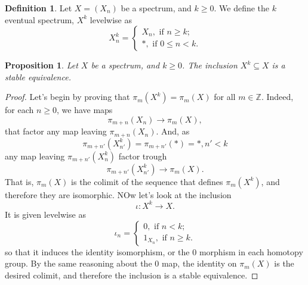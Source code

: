\documentclass[a4paper,english,11pt]{article}
\theoremstyle{definition}
\newtheorem{Def}{Definition}
\theoremstyle{plain}
\newtheorem{prop}{Proposition}[section]
\theoremstyle{remark}
\begin{document}
\begin{Def}
  Let \(X=(X_n)\) be a spectrum, and \(k\geq 0\). We define the \(k\) eventual spectrum, \(X^k\) levelwise as 
  \[X^k_n=\begin{cases}
    X_n,\text{ if }n\geq k;\\
    \ast,\text{ if } 0\leq n < k.
  \end{cases}\]
\end{Def}
\begin{prop}
  Let \(X\) be a spectrum, and \(k\geq 0\). The inclusion \(X^k\subseteq X\) is a stable equivalence.
\end{prop}
\begin{proof}
  Let's begin by proving that \(\pi_m(X^k)=\pi_m(X)\) for all \(m\in\mathbb{Z}\). Indeed, for each \(n\geq 0\), we have maps
  \[\pi_{m+n}(X_n)\to\pi_m(X),\]
  that factor any map leaving \(\pi_{m+n}(X_n)\). And, as 
  \[\pi_{m+n'}(X^k_{n'})=\pi_{m+n'}(\ast)=\ast, n'<k\]
  any map leaving \(\pi_{m+n'}(X^k_n)\) factor trough 
  \[\pi_{m+n'}(X^k_{n'})\to\pi_m(X).\]
  That is, \(\pi_m(X)\) is the colimit of the sequence that defines \(\pi_m(X^k)\), and therefore they are isomorphic. 
  NOw let's look at the inclusion 
  \[\iota:X^k\to X.\]
  It is given levelwise as
  \[\iota_n=\begin{cases}
    0,\text{ if }n<k;\\
    1_{X_n},\text{ if } n\geq k.
  \end{cases}\]
  so that it induces the identity isomorphism, or the \(0\) morphism in each homotopy group. By the same reasoning about the \(0\) map, the identity on \(\pi_m(X)\) is the desired colimit, and therefore the inclusion is a stable equivalence.
\end{proof}
\end{document}
